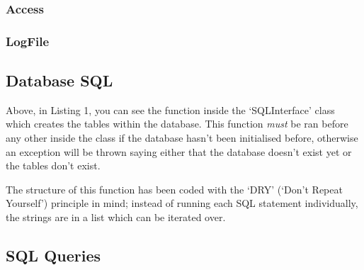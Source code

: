 \documentclass[a4paper]{article}
\begin{document}
\subsubsection{Access}
\subsubsection{LogFile}

\subsection{Database SQL}


Above, in Listing 1, you can see the function inside the `SQLInterface' class which creates the tables
within the database. This function \textit{must} be ran before any other inside the class if the database
hasn't been initialised before, otherwise an exception will be thrown saying either that the database 
doesn't exist yet or the tables don't exist.

The structure of this function has been coded with the `DRY' (`Don't Repeat Yourself') principle in mind;
instead of running each SQL statement individually, the strings are in a list which can be iterated over.

\subsection{SQL Queries}
\end{document}

